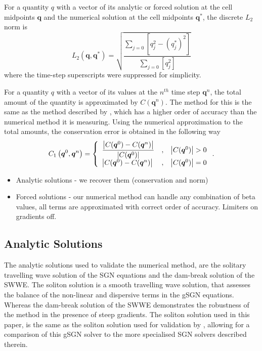 \documentclass[10pt]{elsarticle}
\newcommand\T{\rule{0pt}{3ex }}       %
\newcommand{\vecn}[1]{\boldsymbol{#1}}
\begin{document}
For a quantity $q$ with a vector of its analytic or forced solution at the cell midpoints $\vecn{q}$ and the numerical solution at the cell midpoints $\vecn{q}^*$, the discrete $L_2$ norm is
\begin{equation}
\label{eqn:Conv_Error}
L_2\left(\vecn{q},\vecn{q}^*\right) = \sqrt{ \dfrac{\sum_{j = 0}  \left[q_j^2 - \left(q^*_j\right)^2 \right]}{\sum_{j = 0}  \left[q_j^2 \right]}}
\end{equation}
where the time-step superscripts were suppressed for simplicity.

For a quantity $q$ with a vector of its values at the $n^{th}$ time step $\vecn{q}^n$, the total amount of the quantity is approximated by $C(\vecn{q}^n)$. The method for this is the same as the method described by \citet{Zoppou-etal-2017}, which has a higher order of accuracy than the numerical method it is measuring. Using the numerical approximation to the total amounts, the conservation error is obtained in the following way
\begin{equation}
\label{eqn:Cons_Error}
C_1\left(\vecn{q}^0,\vecn{q}^n\right) = \left \lbrace \begin{array}{l c r}
\dfrac{\left | C(\vecn{q}^0) - C(\vecn{q}^n) \right |}{\left| C(\vecn{q}^0) \right|}&,& \left| C(\vecn{q}^0) \right| > 0 \T \\
\left | C(\vecn{q}^0) - C(\vecn{q}^n) \right |&,& \left| C(\vecn{q}^0) \right| = 0 
\end{array} \right. .
\end{equation}

\begin{itemize}
	\item Analytic solutions - we recover them (conservation and norm)
	\item Forced solutions - our numerical method can handle any combination of beta values, all terms are approximated with correct order of accuracy. Limiters on gradients off. 
\end{itemize}

\subsection{Analytic Solutions}
The analytic solutions used to validate the numerical method, are the solitary travelling wave solution of the SGN equations and the dam-break solution of the SWWE. The soliton solution is a smooth travelling wave solution, that assesses the balance of the non-linear and dispersive terms in the gSGN equations. Whereas the dam-break solution of the SWWE demonstrates the robustness of the method in the presence of steep gradients. The soliton solution used in this paper, is the same as the soliton solution used for validation by \citet{Pitt-2019}, allowing for a comparison of this gSGN solver to the more specialised SGN solvers described therein. 
\end{document}
